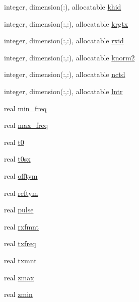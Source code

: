 \begin{DoxyCompactItemize}
\item 
integer, dimension(\+:), allocatable \hyperlink{namespacelg__input__routines_a152f414afe35dd2a3cc3fe4aeb73f16a}{khid}
\item 
integer, dimension(\+:,\+:), allocatable \hyperlink{namespacelg__input__routines_a2e7d7acfc8544ee74be5c4653975d59e}{krgtx}
\item 
integer, dimension(\+:,\+:), allocatable \hyperlink{namespacelg__input__routines_a33045beebfc96f4327913100eaf5c836}{rxid}
\item 
integer, dimension(\+:,\+:), allocatable \hyperlink{namespacelg__input__routines_a1b1ea2c286118a9e13f960c54b61103b}{knorm2}
\item 
integer, dimension(\+:,\+:), allocatable \hyperlink{namespacelg__input__routines_a9175b2b25b77757b5b292b6924ace5b8}{nctd}
\item 
integer, dimension(\+:,\+:), allocatable \hyperlink{namespacelg__input__routines_aba611144680c51239dc61b36cdba8ce7}{lntr}
\item 
real \hyperlink{namespacelg__input__routines_acb44b11a9696ae1c79df024815d346bf}{min\+\_\+freq}
\item 
real \hyperlink{namespacelg__input__routines_a120729b828c4a5845b2e603f0428e70f}{max\+\_\+freq}
\item 
real \hyperlink{namespacelg__input__routines_a1d07f499782c7e039a64c0210710874d}{t0}
\item 
real \hyperlink{namespacelg__input__routines_a59d37d985b0dc7db54d499a25dfdd65a}{t0sx}
\item 
real \hyperlink{namespacelg__input__routines_a76c7f2e1e393a33879bfdb035696a0eb}{offtym}
\item 
real \hyperlink{namespacelg__input__routines_afb36965de38bb47f77fe472111c7f95e}{reftym}
\item 
real \hyperlink{namespacelg__input__routines_a35c66c7854d0833a99927cad810718ac}{pulse}
\item 
real \hyperlink{namespacelg__input__routines_a051730a5273ac4e6b567252982d44414}{rxfmnt}
\item 
real \hyperlink{namespacelg__input__routines_a47c11280e7113256e8989d445a3b205a}{txfreq}
\item 
real \hyperlink{namespacelg__input__routines_ab76d54fe813a2c75ec4592b67c1c96cc}{txmnt}
\item 
real \hyperlink{namespacelg__input__routines_a8ca869a698383a3684c6fdb425b6dd7c}{zmax}
\item 
real \hyperlink{namespacelg__input__routines_a75002fff3768fa349922c4691af835eb}{zmin}

\end{DoxyCompactItemize}
